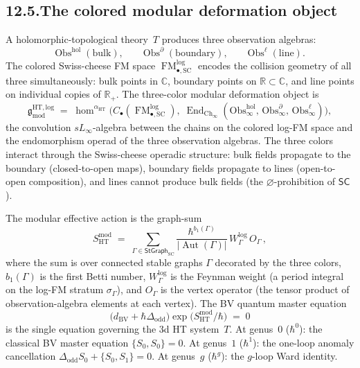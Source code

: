 \documentclass[11pt]{report}
\theoremstyle{definition}
\theoremstyle{remark}
\numberwithin{equation}{section}
\begin{document}
\subsection*{12.5.\enspace The colored modular deformation object}

A holomorphic-topological theory~$T$ produces three observation
algebras:
\[
\mathrm{Obs}^{\mathrm{hol}}\;(\text{bulk}),
\qquad
\mathrm{Obs}^\partial\;(\text{boundary}),
\qquad
\mathrm{Obs}^\ell\;(\text{line}).
\]
The colored Swiss-cheese FM space
$\operatorname{FM}^{\log}_{\bullet,\mathrm{SC}}$ encodes the
collision geometry of all three simultaneously: bulk points in
$\mathbb C$, boundary points on $\mathbb R\subset\mathbb C$, and
line points on individual copies of $\mathbb R_+$. The
three-color modular deformation object is
\[
\mathfrak g^{\mathrm{HT,log}}_{\mathrm{mod}}
\;=\;
\operatorname{hom}^{\alpha_{\mathrm{HT}}}\!\bigl(
C_\bullet(\operatorname{FM}^{\log}_{\bullet,\mathrm{SC}}),\;
\operatorname{End}_{\mathrm{Ch}_\infty}(
\mathrm{Obs}^{\mathrm{hol}}_\infty,\,
\mathrm{Obs}^\partial_\infty,\,
\mathrm{Obs}^\ell_\infty)
\bigr),
\]
the convolution $sL_\infty$-algebra between the chains on the
colored log-FM space and the endomorphism operad of the three
observation algebras. The three colors interact through the
Swiss-cheese operadic structure: bulk fields propagate to the
boundary (closed-to-open maps), boundary fields propagate to
lines (open-to-open composition), and lines cannot produce bulk
fields (the $\varnothing$-prohibition of $\mathsf{SC}$).

The modular effective action is the graph-sum
\[
S^{\mathrm{mod}}_{\mathrm{HT}}
\;=\;
\sum_{\Gamma\in\mathsf{StGraph}_{\mathrm{SC}}}
\frac{\hbar^{b_1(\Gamma)}}{|\operatorname{Aut}(\Gamma)|}
\,W^{\log}_\Gamma\,O_\Gamma\,,
\]
where the sum is over connected stable graphs $\Gamma$ decorated by
the three colors, $b_1(\Gamma)$ is the first Betti number,
$W^{\log}_\Gamma$ is the Feynman weight (a period integral on the
log-FM stratum $\sigma_\Gamma$), and $O_\Gamma$ is the vertex
operator (the tensor product of observation-algebra elements at
each vertex). The BV quantum master equation
\[
\bigl(d_{\mathrm{BV}}+\hbar\Delta_{\mathrm{odd}}\bigr)
\exp\!\bigl(S^{\mathrm{mod}}_{\mathrm{HT}}/\hbar\bigr)
\;=\;0
\]
is the single equation governing the 3d HT system~$T$. At
genus~$0$ ($\hbar^0$): the classical BV master equation
$\{S_0,S_0\}=0$. At genus~$1$ ($\hbar^1$): the one-loop anomaly
cancellation $\Delta_{\mathrm{odd}}S_0+\{S_0,S_1\}=0$. At
genus~$g$ ($\hbar^g$): the $g$-loop Ward identity.
\end{document}
